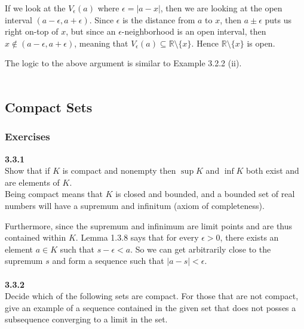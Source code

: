 If we look at the $V_\epsilon (a)$ where $\epsilon = |a - x|$, then we are looking at the open interval
$(a-\epsilon, a+\epsilon)$.
Since $\epsilon$ is the distance from $a$ to $x$, then $a \pm \epsilon$ puts us right on-top of $x$,
but since an $\epsilon$-neighborhood is an open interval, then $x \not\in (a-\epsilon, a+\epsilon)$,
meaning that $V_\epsilon (a) \subseteq \mathbb{R}\setminus\{x\}$.
Hence $\mathbb{R}\setminus\{x\}$ is open.

The logic to the above argument is similar to Example 3.2.2 (ii).
\\~\\







\subsection{Compact Sets}


\subsubsection{Exercises}


\textbf{3.3.1}
\\

Show that if $K$ is compact and nonempty then $\sup K$ and $\inf K$ both exist and are elements of $K$.
\\

Being compact means that $K$ is closed and bounded, and a bounded set of real numbers will have a supremum and infinitum
(axiom of completeness).

Furthermore, since the supremum and infinimum are limit points and are thus contained within $K$.
Lemma 1.3.8 says that for every $\epsilon > 0$, there exists an element $a\in K$ such that $s - \epsilon < a$.
So we can get arbitrarily close to the supremum $s$ and form a sequence such that $|a - s| < \epsilon$.
\\~\\



\label{abbott:3.3.2}
\textbf{3.3.2}
\\

Decide which of the following sets are compact.
For those that are not compact, give an example of a sequence contained in the given set that does not posses
a subsequence converging to a limit in the set.


